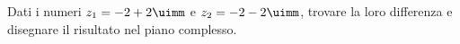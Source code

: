  	Dati i numeri $z_1=-2+2\uimm$ e $z_2=-2-2\uimm$, trovare la loro differenza e  disegnare il risultato  nel piano complesso.
 	\begin{center}
 		
 		\label{fig:disegnopianocomplesso08a}
 	\end{center}
 
